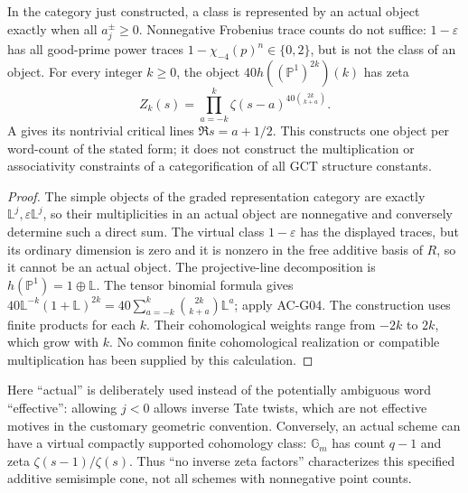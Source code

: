 \begin{proposition}
\label{AC-G06}
In the category just constructed, a class is represented by an actual
object exactly when all $a_j^\pm\geq0$.  Nonnegative Frobenius trace
counts do not suffice: $1-\varepsilon$ has all good-prime power traces
$1-\chi_{-4}(p)^n\in\{0,2\}$, but is not the class of an object.
For every integer $k\geq0$, the object
$40h((\mathbb P^1)^{2k})(k)$ has zeta
\[
 Z_k(s)=\prod_{a=-k}^{k}\zeta(s-a)^{40\binom{2k}{k+a}}.
\]
A gives its nontrivial critical lines $\Re s=a+1/2$.
This constructs one object per word-count of the stated form; it does
not construct the multiplication or associativity constraints of a
categorification of all GCT structure constants.
\end{proposition}
\begin{proof}
The simple objects of the graded representation category are exactly
$\mathbb L^j,\varepsilon\mathbb L^j$, so their multiplicities in an actual
object are nonnegative and conversely determine such a direct sum.
The virtual class $1-\varepsilon$ has the displayed traces, but its
ordinary dimension is zero and it is nonzero in the free additive basis
of $R$, so it cannot be an actual object.
The projective-line decomposition is $h(\mathbb P^1)=1\oplus\mathbb L$.
The tensor binomial formula gives
$40\mathbb L^{-k}(1+\mathbb L)^{2k}
 =40\sum_{a=-k}^k\binom{2k}{k+a}\mathbb L^a$;
apply AC-G04.  The construction uses finite products for each $k$.
Their cohomological weights range from $-2k$ to $2k$, which grow with
$k$.  No common finite cohomological realization or compatible
multiplication has been supplied by this calculation.
\end{proof}

Here ``actual'' is deliberately used instead of the potentially ambiguous
word ``effective'': allowing $j<0$ allows inverse Tate twists, which are
not effective motives in the customary geometric convention.  Conversely,
an actual scheme can have a virtual compactly supported cohomology class:
$\mathbb G_m$ has count $q-1$ and zeta $\zeta(s-1)/\zeta(s)$.
Thus ``no inverse zeta factors'' characterizes this specified additive
semisimple cone, not all schemes with nonnegative point counts.

